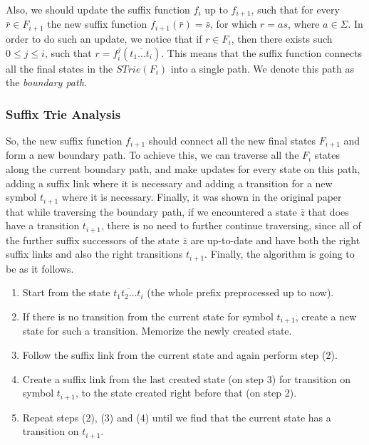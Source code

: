 \documentclass[paper=a4, fontsize=11pt]{scrartcl} %
\numberwithin{equation}{section} %
\numberwithin{figure}{section} %
\numberwithin{table}{section} %
\begin{document}
\par Also, we should update the suffix function $f_i$ up to $f_{i+1}$, such that for every $\bar{r} \in F_{i+1}$ the new suffix function $f_{i+1}(\bar{r}) = \bar{s}$, for which $r = as$, where $a \in \Sigma$. In order to do such an update, we notice that if $r \in F_i$, then there exists such $0 \le j \le i$, such that $r = f_i^j(\overline{t_1...t_i})$. This means that the suffix function connects all the final states in the $STrie(F_i)$ into a single path. We denote this path as the \textit{boundary path}.

\subsubsection{Suffix Trie Analysis}
\par So, the new suffix function $f_{i+1}$ should connect all the new final states $F_{i+1}$ and form a new boundary path. To achieve this, we can traverse all the $F_i$ states along the current boundary path, and make updates for every state on this path, adding a suffix link where it is necessary and adding a transition for a new symbol $t_{i+1}$ where it is necessary. Finally, it was shown in the original paper~\cite{ukkonen1995line} that while traversing the boundary path, if we encountered a state $\bar{z}$ that does have a transition $t_{i+1}$, there is no need to further continue traversing, since all of the further suffix successors of the state $\bar{z}$ are up-to-date and have both the right suffix links and also the right transitions $t_{i+1}$. Finally, the algorithm is going to be as it follows.

\begin{enumerate}
  \item Start from the state $\overline{t_1 t_2 \dots t_i}$ (the whole prefix preprocessed up to now).
  \item If there is no transition from the current state for symbol $t_{i+1}$, create a new state for such a transition. Memorize the newly created state.
  \item Follow the suffix link from the current state and again perform step (2).
  \item Create a suffix link from the last created state (on step 3) for transition on symbol $t_{i+1}$, to the state created right before that (on step 2).
  \item Repeat steps (2), (3) and (4) until we find that the current state has a transition on $t_{i+1}$.
\end{enumerate}
\end{document}

